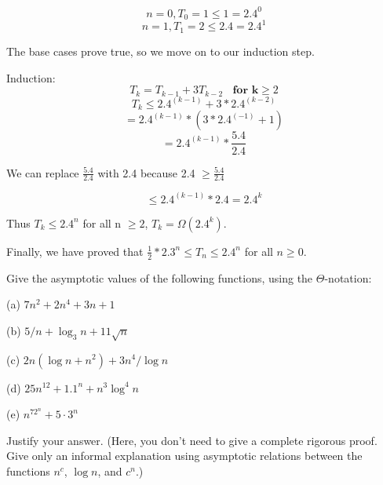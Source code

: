\documentclass{article}
\begin{document}
\begin{solution}
\begin{description}
\begin{equation}
    n = 0, T_0 = 1 \le 1 = 2.4^0
\end{equation}
\begin{equation}
    n = 1, T_1 = 2 \le 2.4 = 2.4^1
\end{equation}

The base cases prove true, so we move on to our induction step.

Induction:
\begin{equation}
T_k = T_{k-1} + 3T_{k-2} \> \> \> \> \textbf{for k} \ge 2
\end{equation}
\begin{equation}
T_k \le 2.4^{(k-1)} + 3 * 2.4^{(k-2)}
\end{equation}
\begin{equation}
= 2.4^{(k-1)} * (3*2.4^{(-1)} + 1)
\end{equation}
\begin{equation}
= 2.4^{(k-1)} * \frac{5.4}{2.4}
\end{equation}


We can replace $\frac{5.4}{2.4}$ with 2.4 because 2.4 $\ge \frac{5.4}{2.4}$


\begin{equation}
\le 2.4^{(k-1)} * 2.4 = 2.4^k
\end{equation}
\begin{description}
Thus $T_k \le 2.4^n$ for all n $\ge 2$, $T_k = \Omega(2.4^k)$.
\end{description}
\begin{description}
Finally, we have proved that $\frac{1}{2} * 2.3^n \le T_n \le 2.4^n$ for all $n \ge 0$.
\end{description}

\end{description}
\end{solution}


\begin{problem}
Give the asymptotic values of the
following functions, using the $\Theta$-notation:
%
\begin{description}
%
\item{(a)} $7n^2 + 2n^4 + 3n + 1$
\item{(b)} $5/n + \log_3 n + 11\sqrt{n}$
\item{(c)} $2n ( \log n + n^2) + 3n^4/\log n$
\item{(d)} $25n^{12} +  1.1^n + n^3\log^4 n$
\item{(e)} $n^72^n + 5\cdot 3^n$
%
\end{description}
%
Justify your answer.
(Here, you don't need to give a complete rigorous proof.
Give only an informal explanation using asymptotic
relations between the functions $n^c$, $\log n$, and $c^n$.)
\end{problem}
\end{document}
